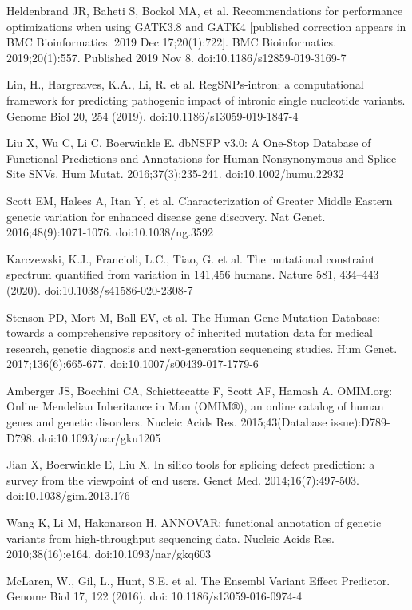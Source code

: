 \documentclass[a4paper,12pt]{article}
\begin{document}
\begin{thebibliography}{100}
Heldenbrand JR, Baheti S, Bockol MA, et al. Recommendations for performance optimizations when using GATK3.8 and GATK4 [published correction appears in BMC Bioinformatics. 2019 Dec 17;20(1):722]. BMC Bioinformatics. 2019;20(1):557. Published 2019 Nov 8. doi:10.1186/s12859-019-3169-7

Lin, H., Hargreaves, K.A., Li, R. et al. RegSNPs-intron: a computational framework for predicting pathogenic impact of intronic single nucleotide variants. Genome Biol 20, 254 (2019). doi:10.1186/s13059-019-1847-4

Liu X, Wu C, Li C, Boerwinkle E. dbNSFP v3.0: A One-Stop Database of Functional Predictions and Annotations for Human Nonsynonymous and Splice-Site SNVs. Hum Mutat. 2016;37(3):235-241. doi:10.1002/humu.22932

Scott EM, Halees A, Itan Y, et al. Characterization of Greater Middle Eastern genetic variation for enhanced disease gene discovery. Nat Genet. 2016;48(9):1071-1076. doi:10.1038/ng.3592

Karczewski, K.J., Francioli, L.C., Tiao, G. et al. The mutational constraint spectrum quantified from variation in 141,456 humans. Nature 581, 434–443 (2020). doi:10.1038/s41586-020-2308-7

Stenson PD, Mort M, Ball EV, et al. The Human Gene Mutation Database: towards a comprehensive repository of inherited mutation data for medical research, genetic diagnosis and next-generation sequencing studies. Hum Genet. 2017;136(6):665-677. doi:10.1007/s00439-017-1779-6

Amberger JS, Bocchini CA, Schiettecatte F, Scott AF, Hamosh A. OMIM.org: Online Mendelian Inheritance in Man (OMIM®), an online catalog of human genes and genetic disorders. Nucleic Acids Res. 2015;43(Database issue):D789-D798. doi:10.1093/nar/gku1205

Jian X, Boerwinkle E, Liu X. In silico tools for splicing defect prediction: a survey from the viewpoint of end users. Genet Med. 2014;16(7):497-503. doi:10.1038/gim.2013.176

Wang K, Li M, Hakonarson H. ANNOVAR: functional annotation of genetic variants from high-throughput sequencing data. Nucleic Acids Res. 2010;38(16):e164. doi:10.1093/nar/gkq603

McLaren, W., Gil, L., Hunt, S.E. et al. The Ensembl Variant Effect Predictor. Genome Biol 17, 122 (2016). doi: 10.1186/s13059-016-0974-4


\end{thebibliography}
\end{document}
